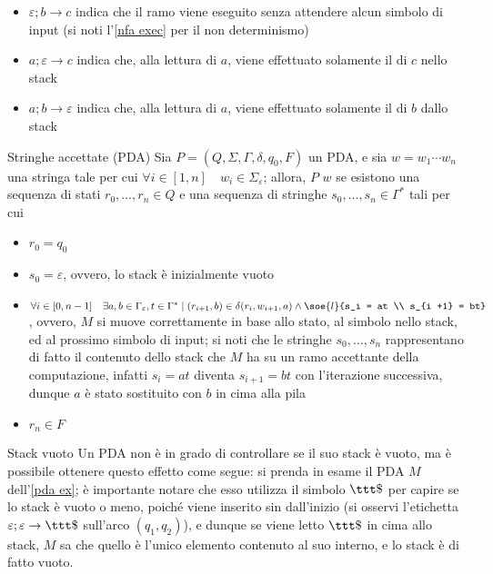 \documentclass[a4paper, 12pt]{report}
\begin{document}
\begin{example}[PDA]
        \begin{itemize}
            \item $\varepsilon; b \to c$ indica che il ramo viene eseguito senza attendere alcun simbolo di input (si noti l'\cref{nfa exec} per il non determinismo)
            \item $a; \varepsilon \to c$ indica che, alla lettura di $a$, viene effettuato solamente il  di $c$ nello stack
            \item $a; b \to \varepsilon$ indica che, alla lettura di $a$, viene effettuato solamente il  di $b$ dallo stack
        \end{itemize}
    \end{example}

    \begin{frameddefn}{Stringhe accettate (PDA)}
        Sia $P = (Q, \Sigma, \Gamma, \delta, q_0, F)$ un PDA, e sia $w = w_1\cdots w_n$ una stringa tale per cui $\forall i \in [1, n] \quad w_i \in \Sigma_\varepsilon$; allora, $P$  $w$ se esistono una sequenza di stati $r_0, \ldots, r_n \in Q$ e una sequenza di stringhe $s_0, \ldots, s_n \in \Gamma ^*$ tali per cui

        \begin{itemize}
            \item $r_0 = q_0$
            \item $s_0 = \varepsilon$, ovvero, lo stack è inizialmente vuoto
            \item $\forall i \in [0, n - 1] \quad \exists a, b \in \Gamma_\varepsilon, t \in \Gamma^* \mid (r_{i + 1}, b) \in \delta(r_i, w_{i + 1}, a) \land \soe{l}{s_i = at \\ s_{i +1} = bt}$, ovvero, $M$ si muove correttamente in base allo stato, al simbolo nello stack, ed al prossimo simbolo di input; si noti che le stringhe $s_0, \ldots, s_n$ rappresentano di fatto il contenuto dello stack che $M$ ha su un ramo accettante della computazione, infatti $s_i = at$ diventa $s_{i + 1} = bt$ con l'iterazione successiva, dunque $a$ è stato sostituito con $b$ in cima alla pila
            \item $r_n \in F$
        \end{itemize}
    \end{frameddefn}

    \begin{framedobs}[label={pda empty stack}]{Stack vuoto}
        Un PDA non è in grado di controllare se il suo stack è vuoto, ma è possibile ottenere questo effetto come segue: si prenda in esame il PDA $M$ dell'\cref{pda ex}; è importante notare che esso utilizza il simbolo $\ttt \$$ per capire se lo stack è vuoto o meno, poiché viene inserito sin dall'inizio (si osservi l'etichetta $\varepsilon; \varepsilon \to \ttt \$$ sull'arco $(q_1, q_2)$), e dunque se viene letto $\ttt \$$ in cima allo stack, $M$ sa che quello è l'unico elemento contenuto al suo interno, e lo stack è di fatto vuoto.
    \end{framedobs}
\end{document}
